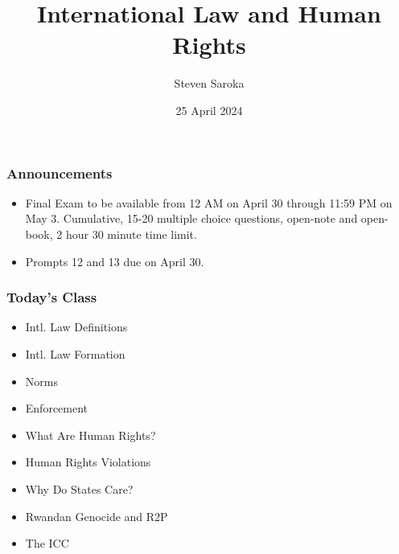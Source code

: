 \documentclass{beamer}
\title[International Law and Human Rights]{\LARGE{International Law and Human Rights}}
\author[POLI 150]{Steven Saroka}
\institute{POLI 150}
\date{25 April 2024}
\begin{document}
\begin{frame}
\titlepage %
\end{frame}



\begin{frame} 
	\frametitle{\LARGE{Announcements}}
	\begin{itemize}
		\item Final Exam to be available from 12 AM on April 30 through 11:59 PM on May 3. Cumulative, 15-20 multiple choice questions, open-note and open-book, 2 hour 30 minute time limit.
		\item Prompts 12 and 13 due on April 30.
	
	\end{itemize}
\end{frame}


\begin{frame} 
	\frametitle{\LARGE{Today's Class}}
	\begin{itemize}

			\item Intl. Law Definitions 

			\item Intl. Law Formation  

			\item Norms 

			\item Enforcement 

			\item What Are Human Rights?

			\item Human Rights Violations

			\item Why Do States Care?

			\item Rwandan Genocide and R2P

			\item The ICC
		
	\end{itemize}
\end{frame}
\end{document}
